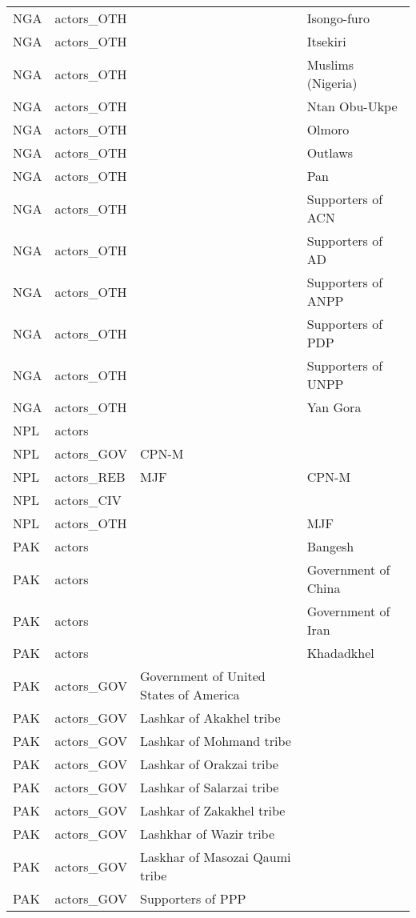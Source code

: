 \begin{table}[ht]
\begin{tabular}{llll}
  NGA & actors\_OTH &  & Isongo-furo \\ 
  NGA & actors\_OTH &  & Itsekiri \\ 
  NGA & actors\_OTH &  & Muslims (Nigeria) \\ 
  NGA & actors\_OTH &  & Ntan Obu-Ukpe \\ 
  NGA & actors\_OTH &  & Olmoro \\ 
  NGA & actors\_OTH &  & Outlaws \\ 
  NGA & actors\_OTH &  & Pan \\ 
  NGA & actors\_OTH &  & Supporters of ACN \\ 
  NGA & actors\_OTH &  & Supporters of AD \\ 
  NGA & actors\_OTH &  & Supporters of ANPP \\ 
  NGA & actors\_OTH &  & Supporters of PDP \\ 
  NGA & actors\_OTH &  & Supporters of UNPP \\ 
  NGA & actors\_OTH &  & Yan Gora \\ 
  NPL & actors &  &  \\ 
  NPL & actors\_GOV & CPN-M &  \\ 
  NPL & actors\_REB & MJF & CPN-M \\ 
  NPL & actors\_CIV &  &  \\ 
  NPL & actors\_OTH &  & MJF \\ 
  PAK & actors &  & Bangesh \\ 
  PAK & actors &  & Government of China \\ 
  PAK & actors &  & Government of Iran \\ 
  PAK & actors &  & Khadadkhel \\ 
  PAK & actors\_GOV & Government of United States of America &  \\ 
  PAK & actors\_GOV & Lashkar of Akakhel tribe &  \\ 
  PAK & actors\_GOV & Lashkar of Mohmand tribe &  \\ 
  PAK & actors\_GOV & Lashkar of Orakzai tribe &  \\ 
  PAK & actors\_GOV & Lashkar of Salarzai tribe &  \\ 
  PAK & actors\_GOV & Lashkar of Zakakhel tribe &  \\ 
  PAK & actors\_GOV & Lashkhar of Wazir tribe &  \\ 
  PAK & actors\_GOV & Laskhar of Masozai Qaumi tribe &  \\ 
  PAK & actors\_GOV & Supporters of PPP &  \\ 

\end{tabular}
\end{table}
